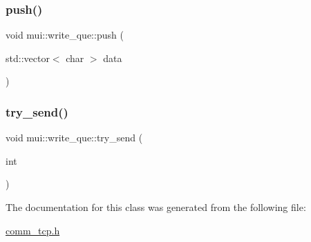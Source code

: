 \mbox{\label{classmui_1_1write__que_ada9cb8be7f83626720a977b063ea2471}} 
\subsubsection{\texorpdfstring{push()}{push()}}
{\footnotesize\ttfamily void mui\+::write\+\_\+que\+::push (\begin{DoxyParamCaption}\item[{std\+::vector$<$ char $>$}]{data }\end{DoxyParamCaption})\hspace{0.3cm}{\ttfamily [inline]}}

\mbox{\label{classmui_1_1write__que_a5edaf16ea1bee75db17644deb983a374}} 
\subsubsection{\texorpdfstring{try\+\_\+send()}{try\_send()}}
{\footnotesize\ttfamily void mui\+::write\+\_\+que\+::try\+\_\+send (\begin{DoxyParamCaption}\item[{int}]{ }\end{DoxyParamCaption})\hspace{0.3cm}{\ttfamily [inline]}}



The documentation for this class was generated from the following file\+:\begin{DoxyCompactItemize}
\item 
\hyperlink{comm__tcp_8h}{comm\+\_\+tcp.\+h}\end{DoxyCompactItemize}
